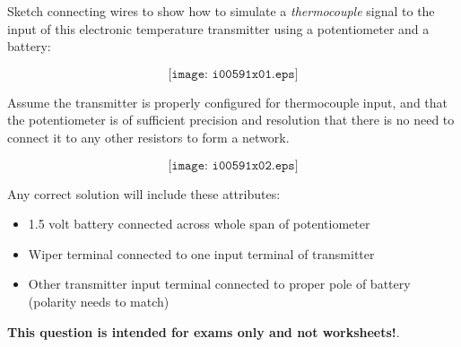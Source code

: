 

Sketch connecting wires to show how to simulate a {\it thermocouple} signal to the input of this electronic temperature transmitter using a potentiometer and a battery:

$$\texttt{[image: i00591x01.eps]}$$

Assume the transmitter is properly configured for thermocouple input, and that the potentiometer is of sufficient precision and resolution that there is no need to connect it to any other resistors to form a network.







$$\texttt{[image: i00591x02.eps]}$$

Any correct solution will include these attributes:

\begin{itemize}
\item{} 1.5 volt battery connected across whole span of potentiometer
\item{} Wiper terminal connected to one input terminal of transmitter
\item{} Other transmitter input terminal connected to proper pole of battery (polarity needs to match)
\end{itemize}







{\bf This question is intended for exams only and not worksheets!}.




